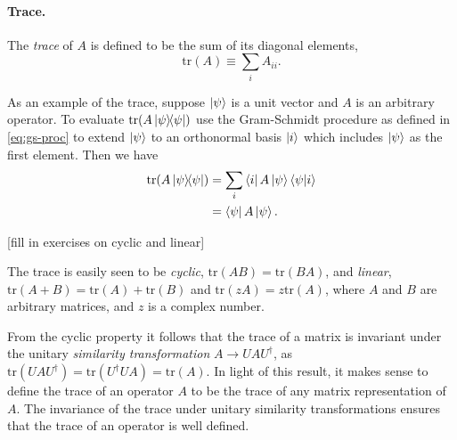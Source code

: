 \documentclass{article}
\begin{document}
\paragraph{Trace.} The \emph{trace} of $A$ is defined to be the sum of its
diagonal elements, \begin{equation}
  \mathrm{tr}(A) \equiv \sum_i A_{ii}. \label{eq:tr}
\end{equation}

As an example of the trace, suppose $\ket{\psi}$ is a unit vector and $A$ is an
arbitrary operator. To evaluate $\mathrm{tr}(A\ketbra{\psi}{\psi})$ use the
Gram-Schmidt procedure as defined in \eqref{eq:gs-proc} to extend $\ket{\psi}$
to an orthonormal basis $\ket{i}$ which includes $\ket{\psi}$ as the first
element. Then we have \begin{align*}
  \mathrm{tr}(A\ketbra{\psi}{\psi})
    &= \sum_i \bra{i}A\ket{\psi} \braket{\psi}{i} \\
    &= \bra{\psi}A\ket{\psi}.
\end{align*}

[fill in exercises on cyclic and linear]

The trace is easily seen to be \emph{cyclic}, $\mathrm{tr}(AB) =
\mathrm{tr}(BA)$, and \emph{linear}, $\mathrm{tr}(A + B) = \mathrm{tr}(A) +
\mathrm{tr}(B)$ and $\mathrm{tr}(zA) = z\mathrm{tr}(A)$, where $A$ and $B$ are
arbitrary matrices, and $z$ is a complex number.

From the cyclic property it follows that the trace of a matrix is invariant
under the unitary \emph{similarity transformation} $A \rightarrow U A
U^\dagger$, as $\mathrm{tr}(U A U^\dagger) = \mathrm{tr}(U^\dagger U A) =
\mathrm{tr}(A)$. In light of this result, it makes sense to define the trace
of an operator $A$ to be the trace of any matrix representation of $A$. The
invariance of the trace under unitary similarity transformations ensures that
the trace of an operator is well defined.


 
\end{document}

